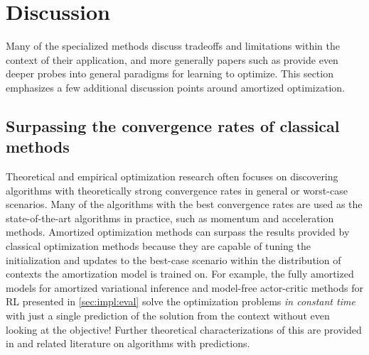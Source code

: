 \chapter{Discussion}
\label{sec:discussion}
Many of the specialized methods discuss tradeoffs and
limitations within the context of their application,
and more generally papers such as
\citet{chen2021learning,metz2021gradients}
provide even deeper probes into general paradigms for
learning to optimize.
This section emphasizes a few additional discussion points
around amortized optimization.

\section{Surpassing the convergence rates of
  classical methods}
\label{sec:convergence}
Theoretical and empirical optimization research often focuses
on discovering algorithms with theoretically strong convergence
rates in general or worst-case scenarios.
Many of the algorithms with the best convergence
rates are used as the state-of-the-art algorithms in practice,
such as momentum and acceleration methods.
Amortized optimization methods can surpass the results
provided by classical optimization methods because they
are capable of tuning the initialization and updates
to the best-case scenario within the distribution of
contexts the amortization model is trained on.
For example, the fully amortized models for amortized variational
inference and model-free actor-critic methods for RL
presented in \cref{sec:impl:eval} solve
the optimization problems \emph{in constant time} with just
a single prediction of the solution from the context without
even looking at the objective!
Further theoretical characterizations of this are provided
in \citet{khodak2022learning} and related literature on
algorithms with predictions.

